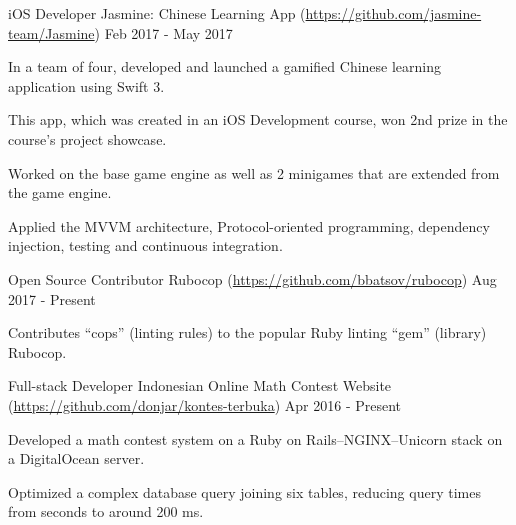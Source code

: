 

\begin{cventries}

  \cventry
  {iOS Developer} %
  {Jasmine: Chinese Learning App (\url{https://github.com/jasmine-team/Jasmine})} %
  {} %
  {Feb 2017 - May 2017} %
  {
    \begin{cvitems} %
    \item {In a team of four, developed and launched a gamified Chinese learning application using Swift 3.}
    \item {This app, which was created in an iOS Development course, won 2nd prize in the course's project showcase.}
    \item {Worked on the base game engine as well as 2 minigames that are extended from the game engine.}
    \item {Applied the MVVM architecture, Protocol-oriented programming, dependency injection, testing and continuous integration.}
    \end{cvitems}
  }

  \cventry
  {Open Source Contributor} %
  {Rubocop (\url{https://github.com/bbatsov/rubocop})} %
  {} %
  {Aug 2017 - Present} %
  {
    \begin{cvitems} %
    \item {Contributes ``cops'' (linting rules) to the popular Ruby linting ``gem'' (library) Rubocop.}
    \end{cvitems}
  }

  \cventry
  {Full-stack Developer} %
  {Indonesian Online Math Contest Website (\url{https://github.com/donjar/kontes-terbuka})} %
  {} %
  {Apr 2016 - Present} %
  {
    \begin{cvitems} %
    \item {Developed a math contest system on a Ruby on Rails--NGINX--Unicorn stack on a DigitalOcean server.}
    \item {Optimized a complex database query joining six tables, reducing query times from seconds to around 200 ms.}
    \end{cvitems}
  }

\end{cventries}
